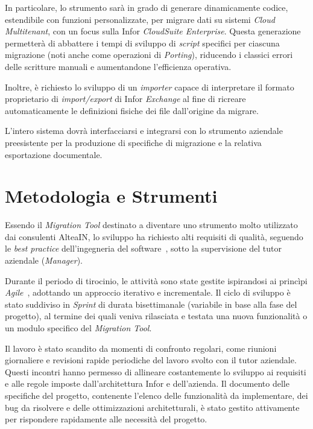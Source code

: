 In particolare, lo strumento sarà in grado di generare dinamicamente codice, estendibile con funzioni personalizzate, per migrare
dati su sistemi \textit{Cloud Multitenant}, con un focus sulla Infor \textit{CloudSuite Enterprise}.
Questa generazione permetterà di abbattere i tempi di sviluppo di \textit{script} specifici per ciascuna
migrazione (noti anche come operazioni di \textit{Porting}), riducendo i classici errori delle scritture manuali e
aumentandone l'efficienza operativa.

Inoltre, è richiesto lo sviluppo di un \textit{importer} capace di interpretare il formato proprietario di \textit{import/export} di
Infor \textit{Exchange} al fine di ricreare automaticamente le definizioni fisiche dei file dall'origine da migrare.

L'intero sistema dovrà interfacciarsi e integrarsi con lo strumento aziendale preesistente per la
produzione di specifiche di migrazione e la relativa esportazione documentale.

\section{Metodologia e Strumenti}\label{sec:metodologia-e-strumenti}
Essendo il \textit{Migration Tool} destinato a diventare uno strumento molto utilizzato dai consulenti AlteaIN,
lo sviluppo ha richiesto alti requisiti di qualità, seguendo le \textit{best practice} dell'ingegneria del software~\cite{sommervilleSoftwareEng},
sotto la supervisione del tutor aziendale (\textit{Manager}).

Durante il periodo di tirocinio, le attività sono state gestite ispirandosi ai princìpi \textit{Agile}~\cite{agileManifesto},
adottando un approccio iterativo e incrementale.
Il ciclo di sviluppo è stato suddiviso in \textit{Sprint} di durata bisettimanale (variabile in base alla fase del progetto),
al termine dei quali veniva rilasciata e testata una nuova funzionalità o un modulo specifico del \textit{Migration Tool}.

Il lavoro è stato scandito da momenti di confronto regolari, come riunioni giornaliere e revisioni rapide periodiche del lavoro svolto
con il tutor aziendale.
Questi incontri hanno permesso di allineare costantemente lo sviluppo ai requisiti e alle regole imposte dall'architettura Infor e dell'azienda.
Il documento delle specifiche del progetto, contenente l'elenco delle funzionalità da implementare, dei bug da risolvere e delle ottimizzazioni architetturali,
è stato gestito attivamente per rispondere rapidamente alle necessità del progetto.

